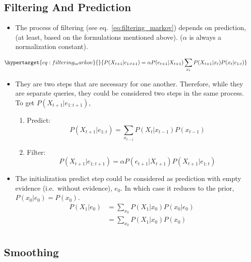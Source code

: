 \documentclass[
]{book}
\providecommand{\tightlist}{%
  \setlength{\itemsep}{0pt}\setlength{\parskip}{0pt}}
\begin{document}
\hypertarget{filtering-and-prediction}{%
\subsection{Filtering And Prediction}\label{filtering-and-prediction}}

\begin{itemize}
\tightlist
\item
  The process of filtering (see eq.~\ref{eq:filtering_markov}) depends
  on prediction, (at least, based on the formulations mentioned above).
  (\(\alpha\) is always a normalization constant).
\end{itemize}

\begin{equation}\protect\hypertarget{eq:filtering_markov}{}{
P(X_{t+1}|e_{1:t+1}) = \alpha P(e_{t+1}|X_{t+1}) \sum_{x_t} P(X_{t+1}|x_t) P(x_t|e_{1:t})
}\label{eq:filtering_markov}\end{equation}

\begin{itemize}
\item
  They are two steps that are necessary for one another. Therefore,
  while they are separate queries, they could be considered two steps in
  the same process. To get \(P(X_{t+1}|e_{1:t+1})\),

  \begin{enumerate}
  \def\labelenumi{\arabic{enumi}.}
  \tightlist
  \item
    Predict: \[
      P(X_{t+1}|e_{1:t}) = \sum_{x_{t-1}} P(X_t|x_{t-1}) P(x_{t-1})
      \]
  \item
    Filter: \[
      P(X_{t+1}|e_{1:t+1}) = \alpha P(e_{t+1}|X_{t+1}) P(X_{t+1}|e_{1:t})
      \]
  \end{enumerate}
\item
  The initialization predict step could be considered as prediction with
  empty evidence (i.e.~without evidence), \(e_0\). In which case it
  reduces to the prior, \(P(x_0|e_0) = P(x_0)\). \[
  \begin{split}
  P(X_1|e_0) &= \sum_{x_0}P(X_1|x_0)P(x_0|e_0) \\
             &= \sum_{x_0}P(X_1|x_0)P(x_0) \\
  \end{split}
  \]
\end{itemize}

\hypertarget{smoothing}{%
\subsection{Smoothing}\label{smoothing}}
\end{document}
